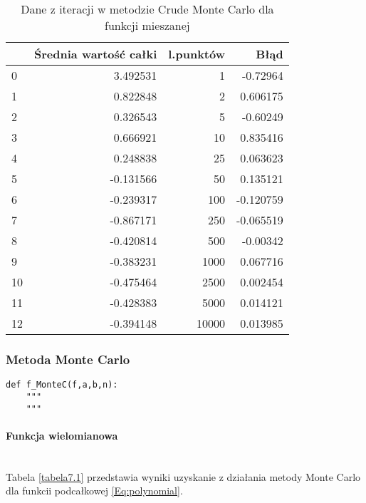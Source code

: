 \documentclass[12pt,twoside]{article}
\begin{document}
\begin{table}[H]
\centering 
\caption{Dane z iteracji w metodzie Crude Monte Carlo dla funkcji mieszanej}
\label{tabela6.3}
\begin{tabular}{lrrr}
\toprule
{} &  Średnia wartość całki &  l.punktów &      Błąd \\
\midrule
0  &               3.492531 &       1 & -0.72964 \\
1  &               0.822848 &       2 &  0.606175 \\
2  &               0.326543 &       5 & -0.60249 \\
3  &               0.666921 &      10 &  0.835416 \\
4  &               0.248838 &      25 &  0.063623 \\
5  &              -0.131566 &      50 &  0.135121 \\
6  &              -0.239317 &     100 & -0.120759 \\
7  &              -0.867171 &     250 & -0.065519 \\
8  &              -0.420814 &     500 & -0.00342 \\
9  &              -0.383231 &    1000 &  0.067716 \\
10 &              -0.475464 &    2500 &  0.002454 \\
11 &              -0.428383 &    5000 &  0.014121 \\
12 &              -0.394148 &   10000 &  0.013985 \\
\bottomrule
\end{tabular}
\end{table}


\subsubsection{Metoda Monte Carlo}

\begin{lstlisting}[caption={Kod w języku python implementujący metodę trapezów}]
def f_MonteC(f,a,b,n):
    """
    """
\end{lstlisting}
\label{Listing 11}

\paragraph{Funkcja wielomianowa}\mbox{} \\

Tabela \eqref{tabela7.1} przedstawia wyniki uzyskanie z działania metody Monte Carlo dla funkcii podcałkowej \eqref{Eq:polynomial}.
\end{document}
